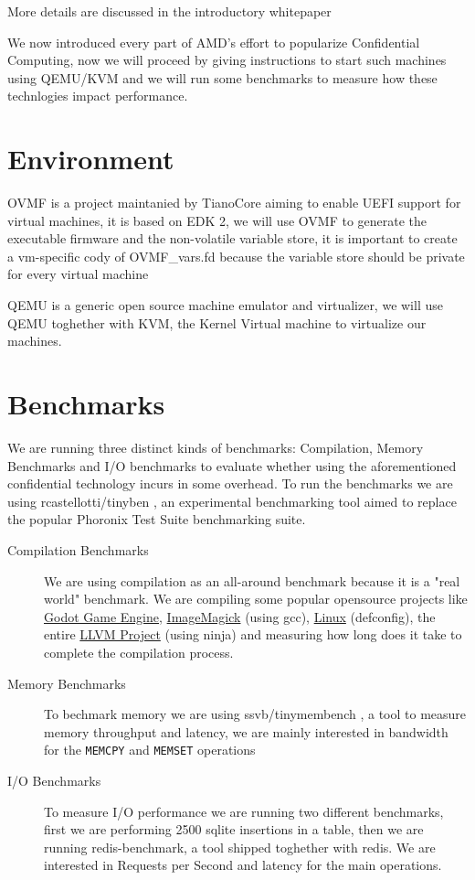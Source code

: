 \documentclass[twocolumn]{article}
\begin{document}
More details are discussed in the introductory whitepaper \cite{sev-snp}

We now introduced every part of AMD's effort to popularize Confidential Computing, now we will proceed by giving instructions to start such machines using QEMU/KVM and we will run some benchmarks to measure how these technlogies impact performance.


\section{Environment}
\label{sec:environment}
OVMF is a project maintanied by TianoCore aiming to enable UEFI support for virtual machines, it is based on EDK 2, we will use OVMF to generate the executable firmware and the non-volatile variable store, it is important to create a vm-specific cody of OVMF\_vars.fd because the variable store should be private for every virtual machine

QEMU is a generic open source machine emulator and virtualizer, we will use QEMU toghether with KVM, the Kernel Virtual machine to virtualize our machines.

\section{Benchmarks}

We are running three distinct kinds of benchmarks: Compilation, Memory Benchmarks and I/O benchmarks to evaluate whether using the aforementioned confidential technology incurs in some overhead. To run the benchmarks we are using rcastellotti/tinyben \cite{tinyben}, an experimental benchmarking tool aimed to replace the popular Phoronix Test Suite \cite{pts} benchmarking suite.

\begin{description}
    \item[Compilation Benchmarks] We are using compilation as an all-around benchmark because it is a "real world" benchmark. We are compiling some popular opensource projects like \href{https://github.com/godotengine/godot}{Godot Game Engine}, \href{https://github.com/imagemagick/imagemagick}{ImageMagick} (using gcc), \href{https://git.kernel.org/pub/scm/linux/kernel/git/torvalds/linux.git}{Linux} (defconfig), the entire \href{https://github.com/llvm/llvm-project}{LLVM Project} (using ninja) and measuring how long does it take to complete the compilation process.
    \item[Memory Benchmarks] To bechmark memory we are using ssvb/tinymembench \cite{tinymembench}, a tool to measure memory throughput and latency, we are mainly interested in bandwidth for the \texttt{MEMCPY} and \texttt{MEMSET} operations
    \item[I/O Benchmarks] To measure I/O performance we are running two different benchmarks, first we are performing 2500 sqlite insertions in a table, then we are running redis-benchmark, a tool shipped toghether with redis. We are interested in Requests per Second and latency for the main operations. 
\end{description}
\end{document}
